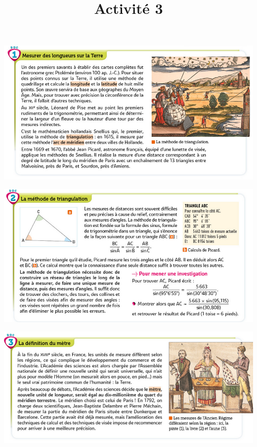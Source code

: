 \documentclass[10pt]{article}
\newcommand{\titreActivite}{Activité 3} %
\newcommand{\myscale}{0.57}
\begin{document}
\date{}
\title{\titreActivite}
\maketitle %


\begin{center}
	\includegraphics[scale=\myscale]{assets/d1.png}

	\includegraphics[scale=\myscale]{assets/d2.png}

	\includegraphics[scale=\myscale]{assets/d3.png}


\end{center}
\end{document}
